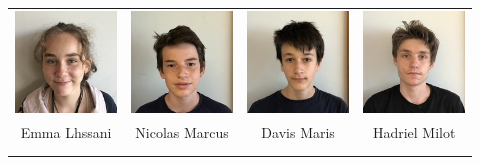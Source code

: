 \begin{center}
\begin{tabular}{cccc}
\includegraphics[angle=270,origin=c, width=27mm]{eleves/Lhssani Emma.JPG} &
\includegraphics[angle=270,origin=c, width=27mm]{eleves/Marcus Nicolas.JPG} &
\includegraphics[angle=270,origin=c, width=27mm]{eleves/Maris David.JPG} &
\includegraphics[angle=270,origin=c, width=27mm]{eleves/Milot Hadriel.JPG} \\
Emma Lhssani & Nicolas Marcus & Davis Maris & Hadriel Milot \\ \\ \\


\end{tabular}
\end{center}
